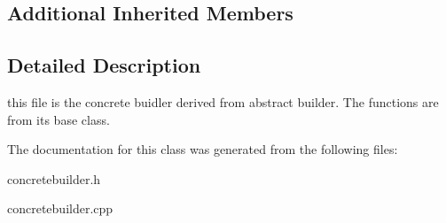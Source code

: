 \subsection*{Additional Inherited Members}


\subsection{Detailed Description}
this file is the concrete buidler derived from abstract builder. The functions are from its base class. 

The documentation for this class was generated from the following files\+:\begin{DoxyCompactItemize}
\item 
concretebuilder.\+h\item 
concretebuilder.\+cpp\end{DoxyCompactItemize}
